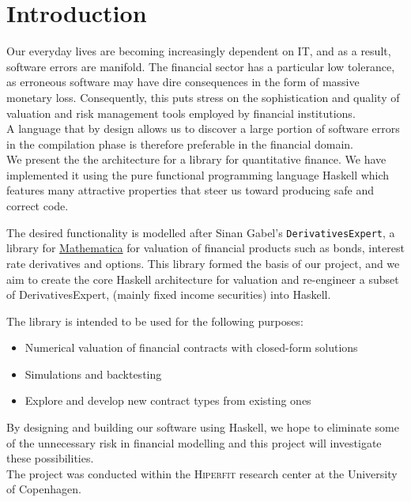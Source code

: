 \chapter{Introduction}

Our everyday lives are becoming increasingly dependent on IT, and as a result,
software errors are manifold. The financial sector has a particular low 
tolerance, as erroneous software may have dire consequences in the form of
massive monetary loss. Consequently, this puts stress on the sophistication and 
quality of valuation and risk management tools employed by financial institutions.\\
A language that by design allows us to discover a large portion of software
errors in the compilation phase is therefore preferable in the financial domain.\\

We present the the architecture for a library for quantitative finance. We have
implemented it using the pure functional programming language Haskell which
features many attractive properties that steer us toward producing safe and
correct code. 

The desired functionality is modelled after Sinan Gabel's 
\texttt{DerivativesExpert}\cite{Mathematica:DerivativesExpert},
a library for \href{http://www.wolfram.com/mathematica/}{Mathematica}
for valuation of financial products such as bonds, interest rate derivatives 
and options. This library formed the basis of our project, and we aim to create
the core Haskell architecture for valuation and re-engineer a subset of DerivativesExpert, 
(mainly fixed income securities) into Haskell.

The library is intended to be used for the following purposes:

\begin{itemize}
\item Numerical valuation of financial contracts with closed-form solutions
\item Simulations and backtesting
\item Explore and develop new contract types from existing ones
\end{itemize}

By designing and building our software using Haskell, we hope to eliminate 
some of the unnecessary risk in financial modelling and this project
will investigate these possibilities.\\

The project was conducted within the \textsc{Hiperfit} research center at the
University of Copenhagen.
